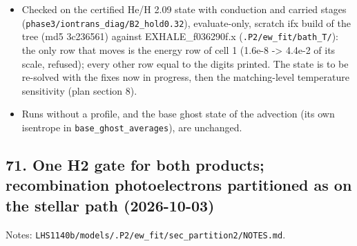 \documentclass[english,a4paper]{my_memo}
\providecommand{\tightlist}{\setlength{\itemsep}{0pt}\setlength{\parskip}{0pt}}
\begin{document}
\begin{itemize}
\tightlist
\item
  Checked on the certified He/H 2.09 state with conduction and carried
  stages (\texttt{phase3/iontrans\_diag/B2\_hold0.32}), evaluate-only, scratch ifx
  build of the tree (md5 3c236561) against EXHALE\_f036290f.x
  (\texttt{.P2/ew\_fit/bath\_T/}): the only row that moves is the energy row of cell
  1 (1.6e-8 -\textgreater{} 4.4e-2 of its scale, refused); every other row equal to the
  digits printed. The state is to be re-solved with the fixes now in
  progress, then the matching-level temperature sensitivity (plan section 8).
\item
  Runs without a profile, and the base ghost state of the advection (its own
  isentrope in \texttt{base\_ghost\_averages}), are unchanged.
\end{itemize}

\subsection{71. One H2 gate for both products; recombination photoelectrons partitioned as on the stellar path (2026-10-03)}\label{71-one-h2-gate-for-both-products-recombination-photoelectrons-partitioned-as-on-the-stellar-path-2026-10-03}

Notes: \texttt{LHS1140b/models/.P2/ew\_fit/sec\_partition2/NOTES.md}.
\end{document}
